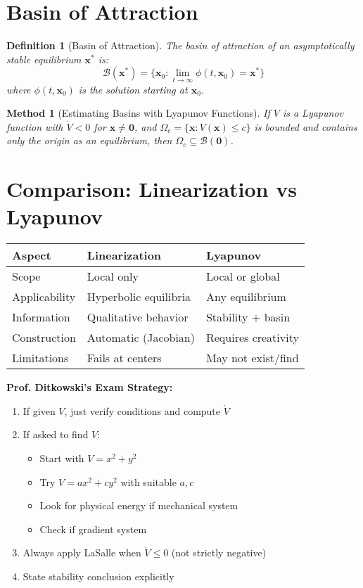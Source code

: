 \documentclass[12pt]{article}
\newtheorem{definition}{Definition}
\newtheorem{method}{Method}
\begin{document}
\section{Basin of Attraction}

\begin{definition}[Basin of Attraction]
The basin of attraction of an asymptotically stable equilibrium $\mathbf{x}^*$ is:
$$\mathcal{B}(\mathbf{x}^*) = \{\mathbf{x}_0 : \lim_{t \to \infty} \phi(t, \mathbf{x}_0) = \mathbf{x}^*\}$$
where $\phi(t, \mathbf{x}_0)$ is the solution starting at $\mathbf{x}_0$.
\end{definition}

\begin{method}[Estimating Basins with Lyapunov Functions]
If $V$ is a Lyapunov function with $\dot{V} < 0$ for $\mathbf{x} \neq \mathbf{0}$, and $\Omega_c = \{\mathbf{x} : V(\mathbf{x}) \leq c\}$ is bounded and contains only the origin as an equilibrium, then $\Omega_c \subseteq \mathcal{B}(\mathbf{0})$.
\end{method}

\section{Comparison: Linearization vs Lyapunov}

\begin{center}
\begin{tabular}{|l|l|l|}
\hline
\textbf{Aspect} & \textbf{Linearization} & \textbf{Lyapunov} \\
\hline
Scope & Local only & Local or global \\
Applicability & Hyperbolic equilibria & Any equilibrium \\
Information & Qualitative behavior & Stability + basin \\
Construction & Automatic (Jacobian) & Requires creativity \\
Limitations & Fails at centers & May not exist/find \\
\hline
\end{tabular}
\end{center}

\begin{examtip}
\textbf{Prof. Ditkowski's Exam Strategy:}
\begin{enumerate}
    \item If given $V$, just verify conditions and compute $\dot{V}$
    \item If asked to find $V$:
    \begin{itemize}
        \item Start with $V = x^2 + y^2$
        \item Try $V = ax^2 + cy^2$ with suitable $a,c$
        \item Look for physical energy if mechanical system
        \item Check if gradient system
    \end{itemize}
    \item Always apply LaSalle when $\dot{V} \leq 0$ (not strictly negative)
    \item State stability conclusion explicitly
\end{enumerate}
\end{examtip}
\end{document}
